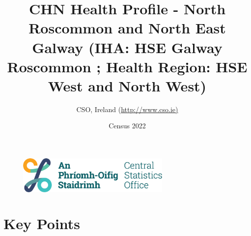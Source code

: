 \documentclass{article}
\title{CHN Health Profile - North Roscommon and North East Galway (IHA: HSE Galway Roscommon ;  Health Region: HSE West and North West) }
\date{Census 2022}
\author{CSO, Ireland  (\url{http://www.cso.ie)}}
\begin{document}


\begin{figure}
	\centering
\includegraphics[width =75mm]{../figures/CSO_Logo.png}
\end{figure}

				 
		   
						  
														  
																																													
												 
			 
\maketitle
					
													   
				 
						 
																																																																											   
				 
				  
  \pagebreak
    	    \tableofcontents

\pagebreak


\section{Key Points}
\end{document}
